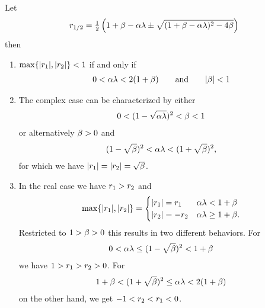 \begin{theorem}
	\label{thm-appdx: momentum - stable set of parameters}
	Let
	\begin{align*}
		r_{1/2}
		= \tfrac12 \left(
			1+\beta-\alpha\lambda \pm \sqrt{(1+\beta-\alpha\lambda)^2 - 4\beta}
		\right)
	\end{align*}
	then 
	\begin{enumerate}
		\item \(\max\{|r_1|,|r_2|\}<1\) if and only if
		\begin{align*}
			0<\alpha\lambda < 2(1+\beta) \qquad \text{and} \qquad |\beta|<1
		\end{align*}
		\item The complex case can be characterized by either
		\begin{align*}
			0<(1-\sqrt{\alpha\lambda})^2 < \beta < 1
		\end{align*}		
		or alternatively \(\beta>0\) and
		\begin{align*}
			(1-\sqrt{\beta})^2 < \alpha\lambda < (1+\sqrt{\beta})^2,
		\end{align*}
		for which we have \(|r_1|=|r_2|=\sqrt{\beta}\).
		
		\item In the real case we have \(r_1>r_2\) and
		\begin{align}\label{eq: when does sigma_1 or sigma_2 dominate?}
			\max\{|r_1|, |r_2|\} = \begin{cases}
				|r_1|=r_1 & \alpha\lambda < 1+\beta \\
				|r_2|=-r_2 & \alpha\lambda \ge 1+\beta.
			\end{cases}
		\end{align}
		Restricted to \(1>\beta>0\) this results in two different	
		behaviors. For
		\begin{align*}
			0<\alpha\lambda \le (1-\sqrt{\beta})^2 < 1+\beta
		\end{align*}
		we have \(1>r_1 > r_2 > 0\). For
		\begin{align*}
			1+\beta < (1+\sqrt{\beta})^2\le \alpha\lambda < 2(1+\beta)
		\end{align*}
		on the other hand, we get \(-1 < r_2 < r_1 < 0\).
	\end{enumerate}
\end{theorem}
